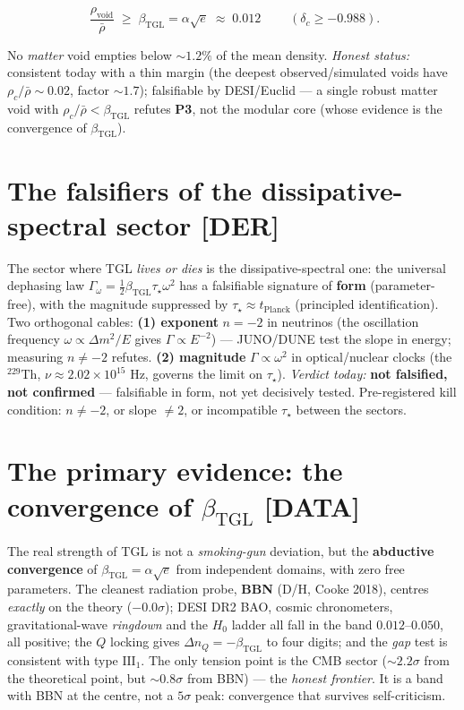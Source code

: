 \documentclass[11pt]{article}
\newcommand{\bTGL}{\beta_{\mathrm{TGL}}}\newcommand{\Msun}{M_{\odot}}\newcommand{\TGL}{\mathrm{TGL}}
\theoremstyle{definition}\newtheorem{deriv}{Derivation}
\begin{document}
\begin{equation}\boxed{\;\frac{\rho_{\mathrm{void}}}{\bar\rho}\;\geq\;\bTGL=\alpha\sqrt{e}\;\approx\;0.012\;}\qquad(\delta_c\geq-0.988).\end{equation}

No \emph{matter} void empties below $\sim1.2\%$ of the mean density. \emph{Honest status:} consistent today with a thin margin (the deepest observed/simulated voids have $\rho_c/\bar\rho\sim0.02$, factor $\sim1.7$); falsifiable by DESI/Euclid --- a single robust matter void with $\rho_c/\bar\rho<\bTGL$ refutes \textbf{P3}, not the modular core (whose evidence is the convergence of $\bTGL$).

\section{The falsifiers of the dissipative-spectral sector \textsf{[DER]}}

The sector where TGL \emph{lives or dies} is the dissipative-spectral one: the universal dephasing law $\Gamma_\omega=\tfrac12\bTGL\tau_\star\omega^2$ has a falsifiable signature of \textbf{form} (parameter-free), with the magnitude suppressed by $\tau_\star\approx t_{\mathrm{Planck}}$ (principled identification). Two orthogonal cables: \textbf{(1) exponent} $n=-2$ in neutrinos (the oscillation frequency $\omega\propto\Delta m^2/E$ gives $\Gamma\propto E^{-2}$) --- JUNO/DUNE test the slope in energy; measuring $n\neq-2$ refutes. \textbf{(2) magnitude} $\Gamma\propto\omega^2$ in optical/nuclear clocks (the $^{229}$Th, $\nu\approx2.02\times10^{15}$ Hz, governs the limit on $\tau_\star$). \emph{Verdict today:} \textbf{not falsified, not confirmed} --- falsifiable in form, not yet decisively tested. Pre-registered kill condition: $n\neq-2$, or slope $\neq2$, or incompatible $\tau_\star$ between the sectors.

\section{The primary evidence: the convergence of $\bTGL$ \textsf{[DATA]}}

The real strength of TGL is not a \emph{smoking-gun} deviation, but the \textbf{abductive convergence} of $\bTGL=\alpha\sqrt{e}$ from independent domains, with zero free parameters. The cleanest radiation probe, \textbf{BBN} (D/H, Cooke 2018), centres \emph{exactly} on the theory ($-0.0\sigma$); DESI DR2 BAO, cosmic chronometers, gravitational-wave \emph{ringdown} and the $H_0$ ladder all fall in the band $0.012$--$0.050$, all positive; the $Q$ locking gives $\Delta n_Q=-\bTGL$ to four digits; and the \emph{gap} test is consistent with type $\mathrm{III}_1$. The only tension point is the CMB sector ($\sim2.2\sigma$ from the theoretical point, but $\sim0.8\sigma$ from BBN) --- the \emph{honest frontier}. It is a band with BBN at the centre, not a $5\sigma$ peak: convergence that survives self-criticism.
\end{document}
